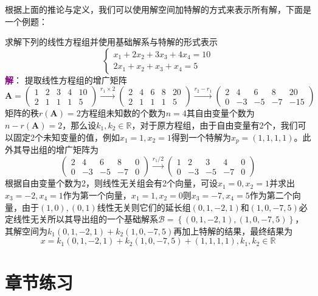 根据上面的推论与定义，我们可以使用解空间加特解的方式来表示所有解，下面是一个例题：

\begin{example}
	求解下列的线性方程组并使用基础解系与特解的形式表示$$\left\{\begin{matrix} 
		x_1+2x_2+3x_3+4x_4=10 \\  
		2x_1+x_2+x_3+x_4=5
	\end{matrix}\right.$$\tcblower
	\textcolor{purple}{\textbf{解}}：
	提取线性方程组的增广矩阵$$\mathbf{A}=\begin{pmatrix}
		1 & 2 & 3 & 4 & 10\\
		2 & 1 & 1 & 1 & 5
	   \end{pmatrix}\xrightarrow{r_1\times 2}
	   \begin{pmatrix}
		2 & 4 & 6 & 8 & 20\\
		2 & 1 & 1 & 1 & 5
	   \end{pmatrix}\xrightarrow{r_2-r_1}
	   \begin{pmatrix}
		2 & 4 & 6 & 8 & 20\\
		0 & -3 & -5 & -7 & -15
	   \end{pmatrix}$$矩阵的秩$r(\mathbf{A})=2$方程组未知数的个数为$n=4$其自由变量个数为$n-r(\mathbf{A})=2$，那么设$k_1,k_2\in \mathbb{R}$，对于原方程组，由于自由变量有2个，我们可以固定2个未知变量的值，例如$x_1=1,x_2=1$得到一个特解为$x_p=(1,1,1,1)$。此外其导出组的增广矩阵为$$\begin{pmatrix}
		2 & 4 & 6 & 8 & 0\\
		0 & -3 & -5 & -7 & 0
	   \end{pmatrix}\xrightarrow{r_1/2}\begin{pmatrix}
		1 & 2 & 3 & 4 & 0\\
		0 & -3 & -5 & -7 & 0
	   \end{pmatrix}$$根据自由变量个数为2，则线性无关组会有2个向量，可设$x_1=0,x_2=1$并求出$x_3=-2,x_4=1$作为第一个向量，$x_1=1,x_2=0$则$x_3=-7,x_4=5$作为第二个向量，由于$(1,0),(0,1)$线性无关则它们的延长组$(0,1,-2,1)$和$(1,0,-7,5)$必定线性无关所以其导出组的一个基础解系$\mathcal{B}=\left\{ (0,1,-2,1),(1,0,-7,5) \right\}$，其解空间为$k_1(0,1,-2,1)+k_2(1,0,-7,5)$再加上特解的结果，最终结果为$$x=k_1(0,1,-2,1)+k_2(1,0,-7,5)+(1,1,1,1),k_1,k_2\in \mathbb{R}$$
\end{example}

\section{章节练习}

